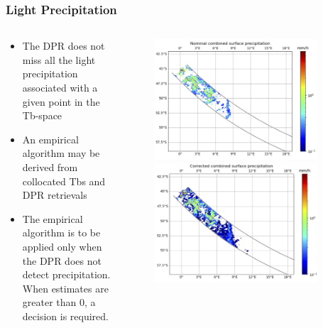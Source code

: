 \documentclass{beamer}
\begin{document}
\begin{frame}
    \frametitle{Light Precipitation}
    \begin{columns}
        \begin{column}{0.55\textwidth}
            \begin{itemize}
            \item The DPR does not miss all the light precipitation associated with a given point in the Tb-space
            \item An empirical algorithm may be derived from collocated Tbs and DPR retrievals
            \item The empirical algorithm is to be applied only when the DPR does not detect precipitation. When estimates are greater than 0, a decision is required.
                
            \end{itemize}
        \end{column}
        \begin{column}{0.5\textwidth}
            \begin{figure}
                \begin{center}
                \includegraphics[width=0.9\textwidth]{Figures/fig12.png}
                \includegraphics[width=0.9\textwidth]{Figures/fig13.png}
                \end{center}
            \end{figure}
        \end{column}
    \end{columns}
\end{frame} 
\end{document}
